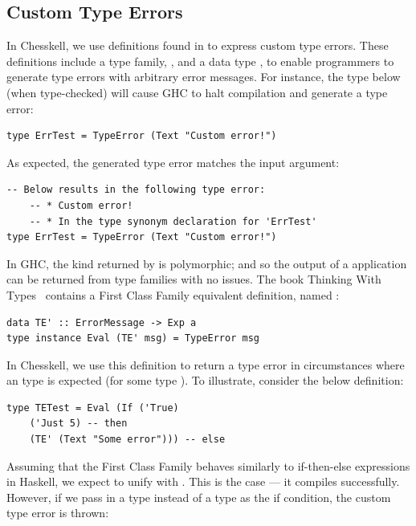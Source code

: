 \subsection{Custom Type Errors}

In Chesskell, we use definitions found in  to express custom type errors. These definitions include a type family, , and a data type , to enable programmers to generate type errors with arbitrary error messages. For instance, the type below (when type-checked) will cause GHC to halt compilation and generate a type error:

\begin{lstlisting}
type ErrTest = TypeError (Text "Custom error!")
\end{lstlisting}

As expected, the generated type error matches the input  argument:

\begin{lstlisting}
-- Below results in the following type error:
    -- * Custom error!
    -- * In the type synonym declaration for 'ErrTest'
type ErrTest = TypeError (Text "Custom error!")
\end{lstlisting}

In GHC, the kind returned by  is polymorphic; and so the output of a  application can be returned from type families with no issues. The book Thinking With Types~\cite{twt} contains a First Class Family equivalent definition, named :

\begin{lstlisting}
data TE' :: ErrorMessage -> Exp a
type instance Eval (TE' msg) = TypeError msg
\end{lstlisting}

In Chesskell, we use this definition to return a type error in circumstances where an  type is expected (for some type ). To illustrate, consider the below definition:

\begin{lstlisting}
type TETest = Eval (If ('True)
    ('Just 5) -- then
    (TE' (Text "Some error"))) -- else
\end{lstlisting}

Assuming that the  First Class Family behaves similarly to if-then-else expressions in Haskell, we expect  to unify with . This is the case --- it compiles successfully. However, if we pass in a  type instead of a  type as the if condition, the custom type error is thrown:

